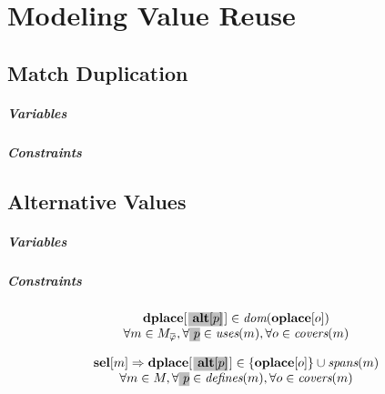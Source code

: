 %

\chapter{Modeling Value Reuse}

\section{Match Duplication}

\paragraph{Variables}
\paragraph{Constraints}

\section{Alternative Values}

\paragraph{Variables}

\paragraph{Constraints}

\begin{equation}
  \begin{array}{c}
    \mVar{dplace}[\hlDiff{\mVar{alt}[p]}[1pt]] \in \mDom(\mVar{oplace}[o]) \\
    \forall m \in \mMatchCompSet{\mPhi},
    \forall \hlDiff{p} \in \mUses(m),
    \forall o \in \mCovers(m)
  \end{array}
  \labelEquation{dom-alt}
\end{equation}

\begin{equation}
  \begin{array}{c}
    \mVar{sel}[m]
    \mImp
    \mVar{dplace}[\hlDiff{\mVar{alt}[p]}[1pt]] \in
      \mSet{\mVar{oplace}[o]} \cup \mSpans(m) \\
    \forall m \in \mMatchSet,
    \forall \hlDiff{p} \in \mDefines(m),
    \forall o \in \mCovers(m)
  \end{array}
  \labelEquation{spanning-alt}
\end{equation}

